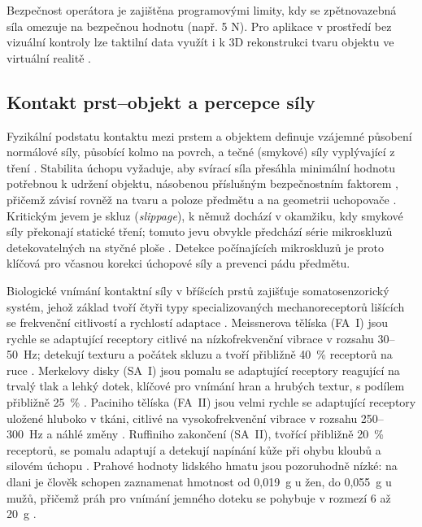 \documentclass[FZS,DP]{tulthesis}
\begin{document}
Bezpečnost operátora je zajištěna programovými limity, kdy se zpětnovazebná síla omezuje na bezpečnou hodnotu (např. 5 N). Pro aplikace v prostředí bez vizuální kontroly lze taktilní data využít i k 3D rekonstrukci tvaru objektu ve virtuální realitě \cite{GIUDICI2025}.

\subsection{Kontakt prst–objekt a percepce síly}
Fyzikální podstatu kontaktu mezi prstem a objektem definuje vzájemné působení normálové síly, působící kolmo na povrch, a tečné (smykové) síly vyplývající z tření \cite{Dutta2002, GIUDICI2025}. Stabilita úchopu vyžaduje, aby svírací síla přesáhla minimální hodnotu potřebnou k udržení objektu, násobenou příslušným bezpečnostním faktorem \cite{Mayer2020427}, přičemž závisí rovněž na tvaru a poloze předmětu a na geometrii uchopovače \cite{Devaraja20201222}. Kritickým jevem je skluz (\textit{slippage}), k němuž dochází v okamžiku, kdy smykové síly překonají statické tření; tomuto jevu obvykle předchází série mikroskluzů detekovatelných na styčné ploše \cite{Begalinova2020, Xu2025}. Detekce počínajících mikroskluzů je proto klíčová pro včasnou korekci úchopové síly a prevenci pádu předmětu.

Biologické vnímání kontaktní síly v bříšcích prstů zajišťuje somatosenzorický systém, jehož základ tvoří čtyři typy specializovaných mechanoreceptorů lišících se frekvenční citlivostí a rychlostí adaptace \cite{Stuchla2024, Cihak2016}. Meissnerova tělíska (FA~I) jsou rychle se adaptující receptory citlivé na nízkofrekvenční vibrace v rozsahu 30–50~Hz; detekují texturu a počátek skluzu a tvoří přibližně 40~\% receptorů na ruce \cite{Stuchla2024, Cihak2016}. Merkelovy disky (SA~I) jsou pomalu se adaptující receptory reagující na trvalý tlak a lehký dotek, klíčové pro vnímání hran a hrubých textur, s podílem přibližně 25~\% \cite{Stuchla2024, Cihak2016}. Paciniho tělíska (FA~II) jsou velmi rychle se adaptující receptory uložené hluboko v tkáni, citlivé na vysokofrekvenční vibrace v rozsahu 250–300~Hz a náhlé změny \cite{Stuchla2024, Cihak2016}. Ruffiniho zakončení (SA~II), tvořící přibližně 20~\% receptorů, se pomalu adaptují a detekují napínání kůže při ohybu kloubů a silovém úchopu \cite{Stuchla2024, Cihak2016}. Prahové hodnoty lidského hmatu jsou pozoruhodně nízké: na dlani je člověk schopen zaznamenat hmotnost od 0,019~g u žen, do 0,055~g u mužů, přičemž práh pro vnímání jemného doteku se pohybuje v rozmezí 6 až 20~g \cite{Stuchla2024}.
\end{document}
